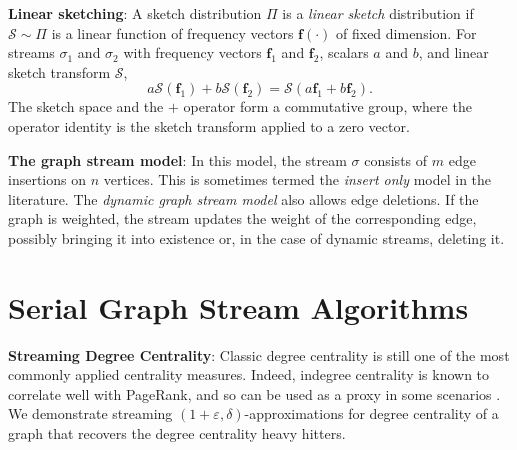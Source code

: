 \documentclass{report}
\begin{document}
\noindent
\textbf{Linear sketching}:
A sketch distribution $\Pi$ is a \emph{linear sketch} distribution if $\mathcal{S} \sim \Pi$ is a linear function of frequency vectors $\mathbf{f}(\cdot)$ of fixed dimension.
%
For streams $\sigma_1$ and $\sigma_2$ with frequency vectors $\mathbf{f}_1$ and $\mathbf{f}_2$, scalars $a$ and $b$, and linear sketch transform $\mathcal{S}$, 
%
\begin{equation} \label{eq:linearity}
a\mathcal{S}(\mathbf{f}_1) + b\mathcal{S}(\mathbf{f}_2) = \mathcal{S}(a\mathbf{f}_1 + b\mathbf{f}_2).
\end{equation}
%
The sketch space and the $+$ operator form a commutative group, where the operator identity is the sketch transform applied to a zero vector.

\noindent
\textbf{The graph stream model}:
In this model, the stream $\sigma$ consists of $m$ edge insertions on $n$ vertices. 
This is sometimes termed the \emph{insert only} model in the literature.
The \emph{dynamic graph stream model} also allows edge deletions.
If the graph is weighted, the stream updates the weight of the corresponding edge, possibly bringing it into existence or, in the case of dynamic streams, deleting it.


\section{Serial Graph Stream Algorithms} \label{intro:sec:serial_streaming}

\textbf{Streaming Degree Centrality}:
Classic degree centrality is still one of the most commonly applied centrality measures.
%
Indeed, indegree centrality is known to correlate well with PageRank, and so can be used as a proxy in some scenarios \cite{upstill2003predicting}.
We demonstrate streaming $(1+\varepsilon, \delta)$-approximations for degree centrality of a graph that recovers the degree centrality heavy hitters.
\end{document}
